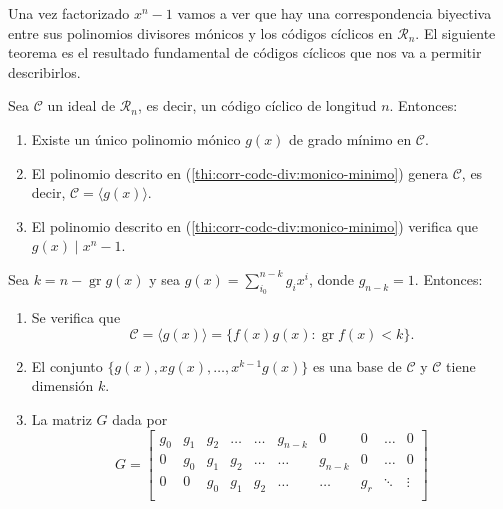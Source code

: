 Una vez factorizado \(x^n - 1\) vamos a ver que hay una correspondencia biyectiva entre sus polinomios divisores mónicos y los códigos cíclicos en \(\mathcal R_n\).
El siguiente teorema es el resultado fundamental de códigos cíclicos que nos va a permitir describirlos.

\begin{theorem}
  \label{th:corr-cod-div}
  Sea \(\mathcal C\) un ideal de \(\mathcal R_n\), es decir, un código cíclico de longitud \(n\). Entonces:
  \begin{enumerate}
    \item Existe un único polinomio mónico \(g(x)\) de grado mínimo en \(\mathcal C\).\label{thi:corr-codc-div:monico-minimo}
    \item El polinomio descrito en (\ref{thi:corr-codc-div:monico-minimo}) genera \(\mathcal C\), es decir, \(\mathcal C = \langle g(x)\rangle\).
    \item El polinomio descrito en (\ref{thi:corr-codc-div:monico-minimo}) verifica que \(g(x) \mid x^n -1\).\label{thi:corr-codc-div:div-xn-1}
  \end{enumerate}
  Sea \(k = n - \operatorname{gr} g(x)\) y sea \(g(x) = \sum_{i_0}^{n-k}g_ix^{i}\), donde \(g_{n-k} = 1\). Entonces:
  \begin{enumerate}[resume]
    \item \label{thi:corr-codc-div:dim-ideal} Se verifica que \[
      \mathcal C = \langle g(x) \rangle = \{f(x)g(x) : \operatorname{gr} f(x) < k\}.
    \]
    \item El conjunto \(\{g(x), xg(x), \dots, x^{k-1}g(x)\}\) es una base de \(\mathcal C\) y \(\mathcal C\) tiene dimensión \(k\).
    \item \label{thi:corr-cod-div:mat-gen} La matriz \(G\) dada por \[
      G = \begin{bmatrix}
        g_0 & g_1 & g_2 & \dots & \dots & g_{n-k} & 0 & 0 & \dots & 0 \\
        0 & g_0 & g_1 & g_2 & \dots & \dots & g_{n-k} & 0 & \dots & 0 \\
        0 & 0 & g_0 & g_1 & g_2 & \dots & \dots & g_r & \ddots & \vdots \\

\end{bmatrix}\]
\end{enumerate}
\end{theorem}
